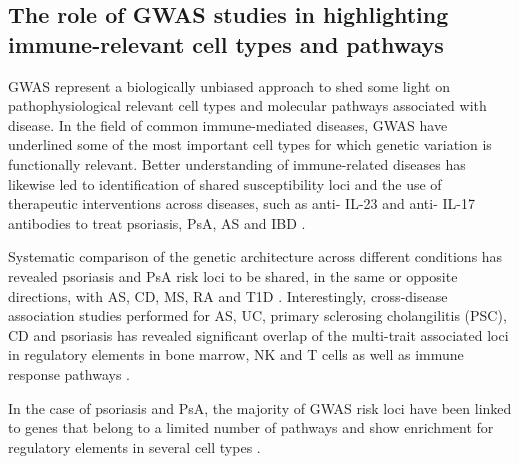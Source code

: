 \subsection{The role of GWAS studies in highlighting immune-relevant cell types and pathways}

GWAS represent a biologically unbiased approach to shed some light on pathophysiological relevant cell types and molecular pathways associated with disease. In the field of common immune-mediated diseases, GWAS have underlined some of the most important cell types for which genetic variation is functionally relevant. Better understanding of immune-related diseases has likewise led to identification of shared susceptibility loci and the use of therapeutic interventions across diseases, such as anti- IL-23 and anti- IL-17 antibodies to treat psoriasis, PsA, AS and IBD \parencite{Visscher2017}.

Systematic comparison of the genetic architecture across different conditions has revealed psoriasis and PsA risk loci to be shared, in the same or opposite directions, with AS, CD, MS, RA and T1D \parencite{ImmunoBase}. Interestingly, cross-disease association studies performed for AS, UC, primary sclerosing cholangilitis (PSC), CD and psoriasis has revealed significant overlap  of the multi-trait associated loci in regulatory elements in bone marrow, NK and T cells as well as immune response pathways \parencite{Ellinghaus2016}. %

In the case of psoriasis and PsA, the majority of GWAS risk loci have been linked to genes that belong to a limited number of pathways and show enrichment for regulatory elements in several cell types \parencite{Capon2017}. 


